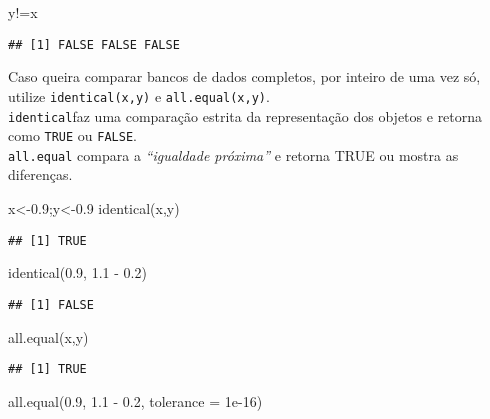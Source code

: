 \documentclass[
]{book}
\newenvironment{Shaded}{\begin{snugshade}}{\end{snugshade}}
\newcommand{\AttributeTok}[1]{\textcolor[rgb]{0.77,0.63,0.00}{#1}}
\newcommand{\FloatTok}[1]{\textcolor[rgb]{0.00,0.00,0.81}{#1}}
\newcommand{\FunctionTok}[1]{\textcolor[rgb]{0.00,0.00,0.00}{#1}}
\newcommand{\NormalTok}[1]{#1}
\newcommand{\OtherTok}[1]{\textcolor[rgb]{0.56,0.35,0.01}{#1}}
\newcommand{\SpecialCharTok}[1]{\textcolor[rgb]{0.00,0.00,0.00}{#1}}
\begin{document}
\begin{Shaded}
\begin{Highlighting}[]
\NormalTok{y}\SpecialCharTok{!=}\NormalTok{x}
\end{Highlighting}
\end{Shaded}

\begin{verbatim}
## [1] FALSE FALSE FALSE
\end{verbatim}

Caso queira comparar bancos de dados completos, por inteiro de uma vez só, utilize \texttt{identical(x,y)} e \texttt{all.equal(x,y)}.\\
\texttt{identical}faz uma comparação estrita da representação dos objetos e retorna como \texttt{TRUE} ou \texttt{FALSE}.\\
\texttt{all.equal} compara a \emph{``igualdade próxima''} e retorna TRUE ou mostra as diferenças.

\begin{Shaded}
\begin{Highlighting}[]
\NormalTok{x}\OtherTok{\textless{}{-}}\FloatTok{0.9}\NormalTok{;y}\OtherTok{\textless{}{-}}\FloatTok{0.9}
\FunctionTok{identical}\NormalTok{(x,y)}
\end{Highlighting}
\end{Shaded}

\begin{verbatim}
## [1] TRUE
\end{verbatim}

\begin{Shaded}
\begin{Highlighting}[]
\FunctionTok{identical}\NormalTok{(}\FloatTok{0.9}\NormalTok{, }\FloatTok{1.1} \SpecialCharTok{{-}} \FloatTok{0.2}\NormalTok{)}
\end{Highlighting}
\end{Shaded}

\begin{verbatim}
## [1] FALSE
\end{verbatim}

\begin{Shaded}
\begin{Highlighting}[]
\FunctionTok{all.equal}\NormalTok{(x,y)}
\end{Highlighting}
\end{Shaded}

\begin{verbatim}
## [1] TRUE
\end{verbatim}

\begin{Shaded}
\begin{Highlighting}[]
\FunctionTok{all.equal}\NormalTok{(}\FloatTok{0.9}\NormalTok{, }\FloatTok{1.1} \SpecialCharTok{{-}} \FloatTok{0.2}\NormalTok{, }\AttributeTok{tolerance =} \FloatTok{1e{-}16}\NormalTok{)}
\end{Highlighting}
\end{Shaded}
\end{document}
